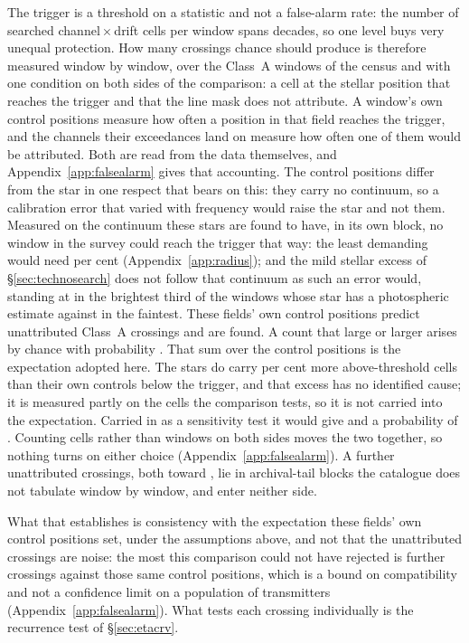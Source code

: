 The trigger is a threshold on a statistic and not a false-alarm rate: the
number of searched channel\,$\times$\,drift cells per window spans
\TuCellsDecades{} decades, so one level buys very unequal protection. How
many crossings chance should produce is therefore measured window by window,
over the \CeNWin{} Class~A windows of the census and with one condition on
both sides of the comparison: a cell at the stellar position that reaches the
trigger and that the line mask does not attribute. A window's own \NCtrl{} control positions measure how often a position in
that field reaches the trigger, and the channels their exceedances land on
measure how often one of them would be attributed. Both are read from the
data themselves, and Appendix~\ref{app:falsealarm} gives that accounting. The control positions differ from the star in one respect that
bears on this: they carry no continuum, so a calibration error that varied
with frequency would raise the star and not them. Measured on the continuum
these stars are found to have, in its own block, no window in the survey
could reach the trigger that way: the least demanding would need
\CyEpsMinPct{} per cent (Appendix~\ref{app:radius}); and the mild stellar
excess of
\S\ref{sec:technosearch} does not follow that continuum as such an error
would, standing at \CkRatioContBright{} in the brightest third of the
\CkNContWin{} windows whose star has a photospheric estimate against
\CkRatioContFaint{} in the faintest. These fields' own control positions predict \CeExp{} unattributed
Class~A crossings and \CeObs{} are found. A count that large or larger arises
by chance with probability \CeProbNull. That sum over the control positions
is the expectation adopted here. The stars do carry \CeStepPct{} per cent
more above-threshold cells than their own controls below the trigger, and
that excess has no identified cause; it is measured partly on the cells the
comparison tests, so it is not carried into the expectation. Carried in as a
sensitivity test it would give \CeExpX{} and a probability of \CeProbStep.
Counting cells rather than windows on both sides moves the two
together, so nothing turns on either choice (Appendix~\ref{app:falsealarm}). A further \CeNTailCrossWord{} unattributed
crossings, both toward \CeTailStar, lie in archival-tail blocks the catalogue
does not tabulate window by window, and enter neither side.

What that establishes is consistency with the expectation these fields' own
control positions set, under the assumptions above, and not that the
unattributed crossings are noise: the most this comparison could not have
rejected is \CeAddLim{} further crossings against those same control
positions, which is a bound on compatibility and not a confidence limit on a
population of transmitters (Appendix~\ref{app:falsealarm}). What tests each
crossing individually is the recurrence test of \S\ref{sec:etacrv}.


